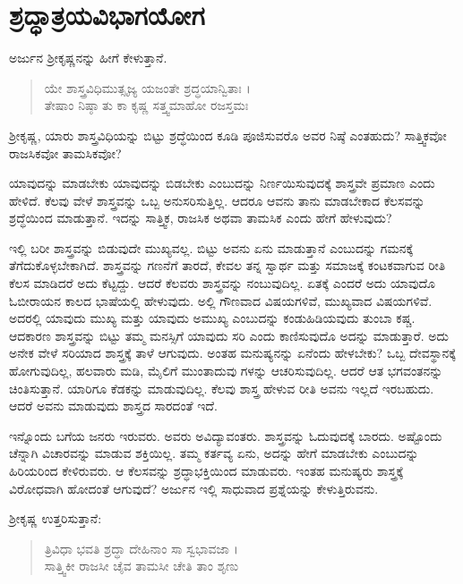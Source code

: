 
\chapter{ಶ್ರದ್ಧಾತ್ರಯವಿಭಾಗಯೋಗ}

ಅರ್ಜುನ ಶ್ರೀಕೃಷ್ಣನನ್ನು ಹೀಗೆ ಕೇಳುತ್ತಾನೆ.

\begin{verse}
ಯೇ ಶಾಸ್ತ್ರವಿಧಿಮುತ್ಸೃಜ್ಯ ಯಜಂತೇ ಶ್ರದ್ಧಯಾನ್ವಿತಾಃ ।\\ತೇಷಾಂ ನಿಷ್ಠಾ ತು ಕಾ ಕೃಷ್ಣ ಸತ್ತ್ವಮಾಹೋ ರಜಸ್ತಮಃ 
\end{verse}

{\small ಶ್ರೀಕೃಷ್ಣ, ಯಾರು ಶಾಸ್ತ್ರವಿಧಿಯನ್ನು ಬಿಟ್ಟು ಶ್ರದ್ಧೆಯಿಂದ ಕೂಡಿ ಪೂಜಿಸುವರೊ ಅವರ ನಿಷ್ಠೆ ಎಂತಹುದು? ಸಾತ್ತ್ವಿಕವೋ ರಾಜಸಿಕವೋ ತಾಮಸಿಕವೋ?}

ಯಾವುದನ್ನು ಮಾಡಬೇಕು ಯಾವುದನ್ನು ಬಿಡಬೇಕು ಎಂಬುದನ್ನು ನಿರ್ಣಯಿಸುವುದಕ್ಕೆ ಶಾಸ್ತ್ರವೇ ಪ್ರಮಾಣ ಎಂದು ಹೇಳಿದೆ. ಕೆಲವು ವೇಳೆ ಶಾಸ್ತ್ರವನ್ನು ಒಬ್ಬ ಅನುಸರಿಸುತ್ತಿಲ್ಲ. ಆದರೂ ಆವನು ತಾನು ಮಾಡಬೇಕಾದ ಕೆಲಸವನ್ನು ಶ್ರದ್ಧೆಯಿಂದ ಮಾಡುತ್ತಾನೆ. ಇದನ್ನು ಸಾತ್ತ್ವಿಕ, ರಾಜಸಿಕ ಅಥವಾ ತಾಮಸಿಕ ಎಂದು ಹೇಗೆ ಹೇಳುವುದು?

ಇಲ್ಲಿ ಬರೀ ಶಾಸ್ತ್ರವನ್ನು ಬಿಡುವುದೇ ಮುಖ್ಯವಲ್ಲ. ಬಿಟ್ಟು ಅವನು ಏನು ಮಾಡುತ್ತಾನೆ ಎಂಬುದನ್ನು ಗಮನಕ್ಕೆ ತೆಗೆದುಕೊಳ್ಳಬೇಕಾಗಿದೆ. ಶಾಸ್ತ್ರವನ್ನು ಗಣನೆಗೆ ತಾರದೆ, ಕೇವಲ ತನ್ನ ಸ್ವಾರ್ಥ ಮತ್ತು ಸಮಾಜಕ್ಕೆ ಕಂಟಕವಾಗುವ ರೀತಿ ಕೆಲಸ ಮಾಡಿದರೆ ಅದು ಕೆಟ್ಟದ್ದು. ಆದರೆ ಕೆಲವರು ಶಾಸ್ತ್ರವನ್ನು ನಂಬುವುದಿಲ್ಲ. ಏತಕ್ಕೆ ಎಂದರೆ ಅದು ಯಾವುದೊ ಓಬೀರಾಯನ ಕಾಲದ ಭಾಷೆಯಲ್ಲಿ ಹೇಳುವುದು. ಅಲ್ಲಿ ಗೌಣವಾದ ವಿಷಯಗಳಿವೆ, ಮುಖ್ಯವಾದ ವಿಷಯಗಳಿವೆ. ಅದರಲ್ಲಿ ಯಾವುದು ಮುಖ್ಯ ಮತ್ತು ಯಾವುದು ಅಮುಖ್ಯ ಎಂಬುದನ್ನು ಕಂಡುಹಿಡಿಯವುದು ತುಂಬಾ ಕಷ್ಚ. ಆದಕಾರಣ ಶಾಸ್ತ್ರವನ್ನು ಬಿಟ್ಟು ತಮ್ಮ ಮನಸ್ಸಿಗೆ ಯಾವುದು ಸರಿ ಎಂದು ಕಾಣಿಸುವುದೊ ಅದನ್ನು ಮಾಡುತ್ತಾರೆ. ಅದು ಅನೇಕ ವೇಳೆ ಸರಿಯಾದ ಶಾಸ್ತ್ರಕ್ಕೆ ತಾಳೆ ಆಗುವುದು. ಅಂತಹ ಮನುಷ್ಯನನ್ನು ಏನೆಂದು ಹೇಳಬೇಕು? ಒಬ್ಬ ದೇವಸ್ಥಾನಕ್ಕೆ ಹೋಗುವುದಿಲ್ಲ, ಹಲವಾರು ಮಡಿ, ಮೈಲಿಗೆ ಮುಂತಾದುವು ಗಳನ್ನು ಆಚರಿಸುವುದಿಲ್ಲ. ಆದರೆ ಆತ ಭಗವಂತನನ್ನು ಚಿಂತಿಸುತ್ತಾನೆ. ಯಾರಿಗೂ ಕೆಡಕನ್ನು ಮಾಡುವುದಿಲ್ಲ. ಕೆಲವು ಶಾಸ್ತ್ರ ಹೇಳುವ ರೀತಿ ಅವನು ಇಲ್ಲದೆ ಇರಬಹುದು. ಆದರೆ ಅವನು ಮಾಡುವುದು ಶಾಸ್ತ್ರದ ಸಾರದಂತೆ ಇದೆ.

ಇನ್ನೊಂದು ಬಗೆಯ ಜನರು ಇರುವರು. ಅವರು ಅವಿದ್ಯಾವಂತರು. ಶಾಸ್ತ್ರವನ್ನು ಓದುವುದಕ್ಕೆ ಬಾರದು. ಅಷ್ಟೊಂದು ಚೆನ್ನಾಗಿ ವಿಚಾರವನ್ನು ಮಾಡುವ ಶಕ್ತಿಯಿಲ್ಲ. ತಮ್ಮ ಕರ್ತವ್ಯ ಏನು, ಅದನ್ನು ಹೇಗೆ ಮಾಡಬೇಕು ಎಂಬುದನ್ನು ಹಿರಿಯರಿಂದ ಕೇಳಿರುವರು. ಆ ಕೆಲಸವನ್ನು ಶ್ರದ್ಧಾಭಕ್ತಿಯಿಂದ ಮಾಡುವರು. ಇಂತಹ ಮನುಷ್ಯರು ಶಾಸ್ತ್ರಕ್ಕೆ ವಿರೋಧವಾಗಿ ಹೋದಂತೆ ಆಗುವುದೆ? ಅರ್ಜುನ ಇಲ್ಲಿ ಸಾಧುವಾದ ಪ್ರಶ್ನೆಯನ್ನು ಕೇಳುತ್ತಿರುವನು.

ಶ್ರೀಕೃಷ್ಣ ಉತ್ತರಿಸುತ್ತಾನೆ:

\begin{verse}
ತ್ರಿವಿಧಾ ಭವತಿ ಶ್ರದ್ಧಾ ದೇಹಿನಾಂ ಸಾ ಸ್ವಭಾವಜಾ ।\\ಸಾತ್ತ್ವಿಕೀ ರಾಜಸೀ ಚೈವ ತಾಮಸೀ ಚೇತಿ ತಾಂ ಶೃಣು 
\end{verse}

